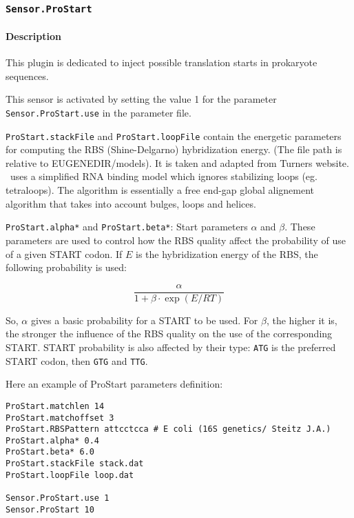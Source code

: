 
\subsubsection{\texttt{Sensor.ProStart}}
\label{prostart}
\paragraph{Description}

This plugin is dedicated to inject possible translation starts in prokaryote sequences.

This sensor is activated by setting the value 1 for the parameter \texttt{Sensor.ProStart.use} in the parameter file.

\texttt{ProStart.stackFile} and \texttt{ProStart.loopFile} contain the energetic parameters for computing the RBS 
(Shine-Delgarno) hybridization energy. (The file path is relative to EUGENEDIR/models).
It is taken and adapted from Turners website.
\EuGene\ uses a simplified RNA binding model which ignores stabilizing loops (eg. tetraloops). 
The algorithm is essentially a free end-gap global alignement algorithm that takes into account bulges, loops and helices.

\texttt{ProStart.alpha*} and \texttt{ProStart.beta*}: Start parameters $\alpha$ and $\beta$. 
These parameters are used to control how the RBS quality affect the probability of use of a given START codon. 
If $E$ is the hybridization energy of the RBS, the following probability is used:

\[\frac{\alpha}{1+\beta\cdot\exp(E/RT)}\]
  
So, $\alpha$ gives a basic probability for a START to be used. For $\beta$, the
higher it is, the stronger the influence of the RBS quality on the use of
the corresponding START.  START probability is also affected by their type: 
\texttt{ATG} is the preferred START codon, then \texttt{GTG} and \texttt{TTG}.

Here an example of ProStart parameters definition:

\begin{Verbatim}[fontsize=\small]
ProStart.matchlen 14
ProStart.matchoffset 3
ProStart.RBSPattern attcctcca # E coli (16S genetics/ Steitz J.A.)
ProStart.alpha* 0.4
ProStart.beta* 6.0
ProStart.stackFile stack.dat
ProStart.loopFile loop.dat

Sensor.ProStart.use 1
Sensor.ProStart 10
\end{Verbatim}
                                                           
